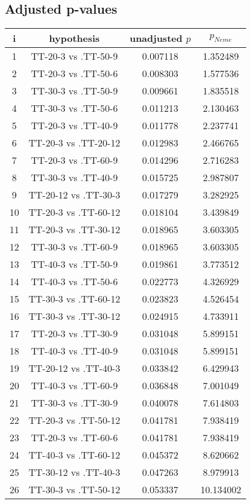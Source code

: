 \documentclass[a4paper,10pt]{article}
\begin{document}
\begin{landscape}
\pagebreak

\subsection{Adjusted p-values}

\begin{table}[!htp]
\centering\scriptsize
\begin{tabular}{cccc}
i&hypothesis&unadjusted $p$&$p_{Neme}$\\
\hline1&TT-20-3 vs .TT-50-9&0.007118&1.352489\\
2&TT-20-3 vs .TT-50-6&0.008303&1.577536\\
3&TT-30-3 vs .TT-50-9&0.009661&1.835518\\
4&TT-30-3 vs .TT-50-6&0.011213&2.130463\\
5&TT-20-3 vs .TT-40-9&0.011778&2.237741\\
6&TT-20-3 vs .TT-20-12&0.012983&2.466765\\
7&TT-20-3 vs .TT-60-9&0.014296&2.716283\\
8&TT-30-3 vs .TT-40-9&0.015725&2.987807\\
9&TT-20-12 vs .TT-30-3&0.017279&3.282925\\
10&TT-20-3 vs .TT-60-12&0.018104&3.439849\\
11&TT-20-3 vs .TT-30-12&0.018965&3.603305\\
12&TT-30-3 vs .TT-60-9&0.018965&3.603305\\
13&TT-40-3 vs .TT-50-9&0.019861&3.773512\\
14&TT-40-3 vs .TT-50-6&0.022773&4.326929\\
15&TT-30-3 vs .TT-60-12&0.023823&4.526454\\
16&TT-30-3 vs .TT-30-12&0.024915&4.733911\\
17&TT-20-3 vs .TT-30-9&0.031048&5.899151\\
18&TT-40-3 vs .TT-40-9&0.031048&5.899151\\
19&TT-20-12 vs .TT-40-3&0.033842&6.429943\\
20&TT-40-3 vs .TT-60-9&0.036848&7.001049\\
21&TT-30-3 vs .TT-30-9&0.040078&7.614803\\
22&TT-20-3 vs .TT-50-12&0.041781&7.938419\\
23&TT-20-3 vs .TT-60-6&0.041781&7.938419\\
24&TT-40-3 vs .TT-60-12&0.045372&8.620662\\
25&TT-30-12 vs .TT-40-3&0.047263&8.979913\\
26&TT-30-3 vs .TT-50-12&0.053337&10.134002\\

\end{tabular}
\end{table}
\end{landscape}
\end{document}
